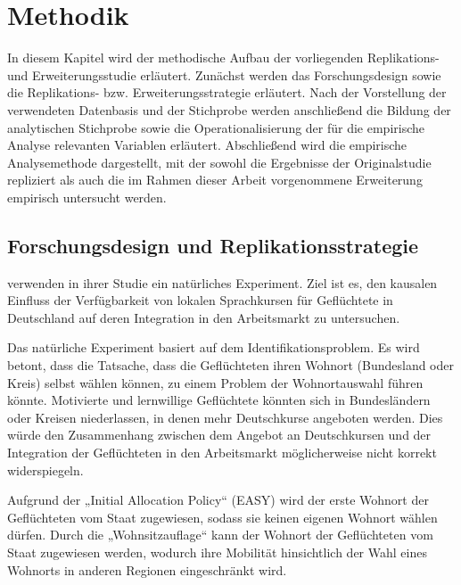 \chapter{Methodik}
\label{cha:methodik}

In diesem Kapitel wird der methodische Aufbau der vorliegenden Replikations- und Erweiterungsstudie erläutert. Zunächst werden das Forschungsdesign sowie die Replikations- bzw. Erweiterungsstrategie erläutert. Nach der Vorstellung der verwendeten Datenbasis und der Stichprobe werden anschließend die Bildung der analytischen Stichprobe sowie die Operationalisierung der für die empirische Analyse relevanten Variablen erläutert. Abschließend wird die empirische Analysemethode dargestellt, mit der sowohl die Ergebnisse der Originalstudie repliziert als auch die im Rahmen dieser Arbeit vorgenommene Erweiterung empirisch untersucht werden.

\section{Forschungsdesign und Replikationsstrategie}
\label{cha:replikationsstrategie}

\textcite{Kanas:2023} verwenden in ihrer Studie ein natürliches Experiment. Ziel ist es, den kausalen Einfluss der Verfügbarkeit von lokalen Sprachkursen für Geflüchtete in Deutschland auf deren Integration in den Arbeitsmarkt zu untersuchen.

Das natürliche Experiment basiert auf dem Identifikationsproblem. Es wird betont, dass die Tatsache, dass die Geflüchteten ihren Wohnort (Bundesland oder Kreis) selbst wählen können, zu einem Problem der Wohnortauswahl führen könnte. Motivierte und lernwillige Geflüchtete könnten sich in Bundesländern oder Kreisen niederlassen, in denen mehr Deutschkurse angeboten werden. Dies würde den Zusammenhang zwischen dem Angebot an Deutschkursen und der Integration der Geflüchteten in den Arbeitsmarkt möglicherweise nicht korrekt widerspiegeln.

Aufgrund der „Initial Allocation Policy“ (EASY) wird der erste Wohnort der Geflüchteten vom Staat zugewiesen, sodass sie keinen eigenen Wohnort wählen dürfen. Durch die „Wohnsitzauflage“ kann der Wohnort der Geflüchteten vom Staat zugewiesen werden, wodurch ihre Mobilität hinsichtlich der Wahl eines Wohnorts in anderen Regionen eingeschränkt wird.

